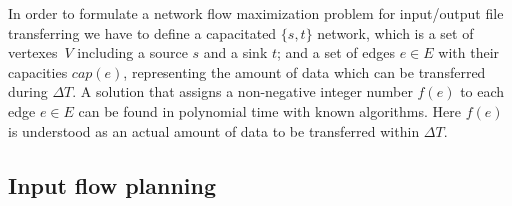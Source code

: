 \documentclass{svjour3}                     %
\begin{document}
In order to formulate a network flow maximization problem \cite{Network_flows}
for input/output file transferring we have to define a capacitated $\{s,t\}$
network, which is a set of vertexes~$V$ including a source $s$ and a sink $t$;
and a set of edges $e\in E$ with their capacities $cap(e)$, representing the amount of data which can be transferred during $\Delta T$. A solution that
assigns a non-negative integer number $f(e)$ to each edge $e \in E$ can be
found in polynomial time with known algorithms. Here $f(e)$ is understood as an actual amount of data to be transferred within $\Delta T$.

\subsection{Input flow planning}
\end{document}
